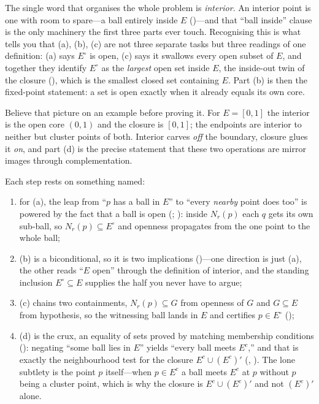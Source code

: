 \documentclass[main.tex]{subfiles}
\begin{document}
\begin{Reflection}
The single word that organises the whole problem is \emph{interior}. An interior point is one with
room to spare---a ball entirely inside $E$ ()---and that ``ball inside'' clause is the only
machinery the first three parts ever touch. Recognising this is what tells you that (a), (b), (c) are
not three separate tasks but three readings of one definition: (a) says $E^{\circ}$ is open, (c) says it
swallows every open subset of $E$, and together they identify $E^{\circ}$ as the \emph{largest} open
set inside $E$, the inside-out twin of the closure (), which is the smallest closed set
containing $E$. Part (b) is then the fixed-point statement: a set is open exactly when it already equals
its own core.

Believe that picture on an example before proving it. For $E=[0,1]$ the interior is the open core
$(0,1)$ and the closure is $[0,1]$; the endpoints are interior to neither but cluster points of both.
Interior carves \emph{off} the boundary, closure glues it \emph{on}, and part (d) is the precise
statement that these two operations are mirror images through complementation.

Each step rests on something named:
\begin{enumerate}[leftmargin=1.7em,itemsep=3pt,topsep=2pt,label=\textnormal{(\arabic*)}]
  \item for (a), the leap from ``$p$ has a ball in $E$'' to ``every \emph{nearby} point does too'' is
        powered by the fact that a ball is open (; ): inside $N_{r}(p)$ each $q$ gets its own sub-ball, so $N_{r}(p)\subseteq E^{\circ}$ and
        openness propagates from the one point to the whole ball;
  \item (b) is a biconditional, so it is two implications ()---one direction is just (a),
        the other reads ``$E$ open'' through the definition of interior, and the standing inclusion
        $E^{\circ}\subseteq E$ supplies the half you never have to argue;
  \item (c) chains two containments, $N_{r}(p)\subseteq G$ from openness of $G$ and $G\subseteq E$ from
        hypothesis, so the witnessing ball lands in $E$ and certifies $p\in E^{\circ}$ ();
  \item (d) is the crux, an equality of sets proved by matching membership conditions ():
        negating ``some ball lies in $E$'' yields ``every ball meets $E^{c}$,'' and that is exactly the
        neighbourhood test for the closure $E^{c}\cup(E^{c})'$ (, ). The lone
        subtlety is the point $p$ itself---when $p\in E^{c}$ a ball meets $E^{c}$ at $p$ without $p$
        being a cluster point, which is why the closure is $E^{c}\cup(E^{c})'$ and not $(E^{c})'$ alone.
\end{enumerate}


\end{Reflection}
\end{document}
